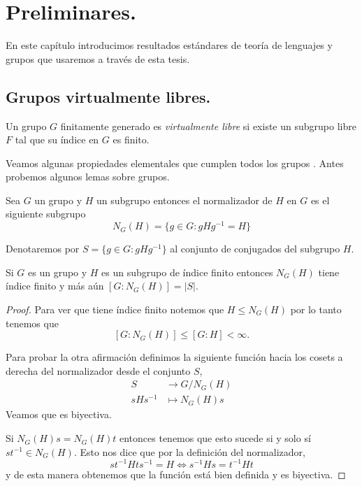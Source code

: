 \documentclass[tesis.tex]{subfiles}
\begin{document}
\chapter{Preliminares.}

En este capítulo introducimos resultados estándares de teoría de lenguajes y grupos que usaremos a través de esta tesis.

\section{Grupos virtualmente libres.}
\begin{deff}
	Un grupo $G$ finitamente generado es \emph{virtualmente libre} si existe un subgrupo libre $F$ tal que su índice en $G$ es finito.
\end{deff}

Veamos algunas propiedades elementales que cumplen todos los grupos \vl. 
Antes probemos algunos lemas sobre grupos.
\begin{deff}
	Sea $G$ un grupo y $H$ un subgrupo entonces el normalizador de $H$ en $G$ es el siguiente subgrupo
	\begin{equation*}
		N_G(H) = \{ g\in G : gHg^{-1} = H  \}
	\end{equation*}
\end{deff}

Denotaremos por $S= \{ g \in G :  gHg^{-1} \}$ al conjunto de conjugados del subgrupo $H$. 

\begin{lema}\label{lema_normalizador_conjugados}
	Si $G$ es un grupo \fg y $H$ es un subgrupo de índice finito entonces $N_G(H)$ tiene índice finito y más aún $[G:N_G(H)] = |S|$.
\end{lema}
\begin{proof}
	Para ver que tiene índice finito notemos que $H \le N_G(H)$ por lo tanto tenemos que 
	\[
	[G:N_G(H)] \le [G:H] < \infty.
	\]
	
	Para probar la otra afirmación definimos la siguiente función hacia los cosets a derecha del normalizador desde el conjunto $S$,
	\begin{align*}
		S  &\to  G/N_G(H) \\
		sHs^{-1} &\mapsto N_G(H)s
	\end{align*}
	Veamos que es biyectiva.
	
	Si $N_G(H)s = N_G(H)t$ entonces tenemos que esto sucede si y solo sí $st^{-1} \in N_G(H)$.
	Esto nos dice que por la definición del normalizador,
	\[
	st^{-1} H ts^{-1} = H \iff s^{-1}Hs = t^{-1}Ht
	\]
	y de esta manera obtenemos que la función está bien definida y es biyectiva.
\end{proof}
\end{document}
